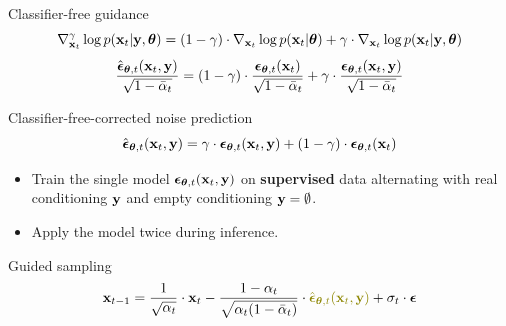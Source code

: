 \begin{frame}{Classifier-free guidance}
	\[
		\nabla_{\mathbf{x}_t}^{\gamma} \log p(\mathbf{x}_t | \mathbf{y}, \boldsymbol{\theta}) =  (1 - \gamma) \cdot  \nabla_{\mathbf{x}_t} \log p(\mathbf{x}_t | \boldsymbol{\theta}) + \gamma \cdot  \nabla_{\mathbf{x}_t} \log p(\mathbf{x}_t| \mathbf{y}, \boldsymbol{\theta})
	\]
	\[
		\frac{\hat{\boldsymbol{\epsilon}}_{\boldsymbol{\theta}, t}(\mathbf{x}_t, \mathbf{y})}{\sqrt{1 - \bar{\alpha}_t}} = (1 - \gamma) \cdot  \frac{\boldsymbol{\epsilon}_{\boldsymbol{\theta}, t}(\mathbf{x}_t)}{\sqrt{1 - \bar{\alpha}_t}} +  \gamma \cdot \frac{\boldsymbol{\epsilon}_{\boldsymbol{\theta}, t}(\mathbf{x}_t, \mathbf{y})}{\sqrt{1 - \bar{\alpha}_t}} 
	\]
	\begin{block}{Classifier-free-corrected noise prediction}
		\vspace{-0.3cm}
		\[
			\hat{\boldsymbol{\epsilon}}_{\boldsymbol{\theta}, t}(\mathbf{x}_t, \mathbf{y}) = \gamma \cdot \boldsymbol{\epsilon}_{\boldsymbol{\theta}, t}(\mathbf{x}_t, \mathbf{y}) + (1 - \gamma) \cdot \boldsymbol{\epsilon}_{\boldsymbol{\theta}, t}(\mathbf{x}_t)
		\]
		\vspace{-0.5cm}
	\end{block}
	\begin{itemize}
		\item Train the single model $\boldsymbol{\epsilon}_{\boldsymbol{\theta}, t}(\mathbf{x}_t, \mathbf{y})$ on \textbf{supervised} data alternating with real conditioning $\mathbf{y}$ and empty conditioning $\mathbf{y} = \emptyset$.
		\item Apply the model twice during inference.
	\end{itemize}
	\begin{block}{Guided sampling}
		\vspace{-0.3cm}
		\[
			\bx_{t-1} = \frac{1}{\sqrt{\alpha_t}} \cdot \bx_t - \frac{1 - \alpha_t}{\sqrt{\alpha_t (1 - \bar{\alpha}_t)}} \cdot  {\color{olive}\hat{\bepsilon}_{\btheta, t}(\bx_t, \by)} + \sigma_t \cdot \bepsilon
		\]
	\end{block}
\end{frame}
